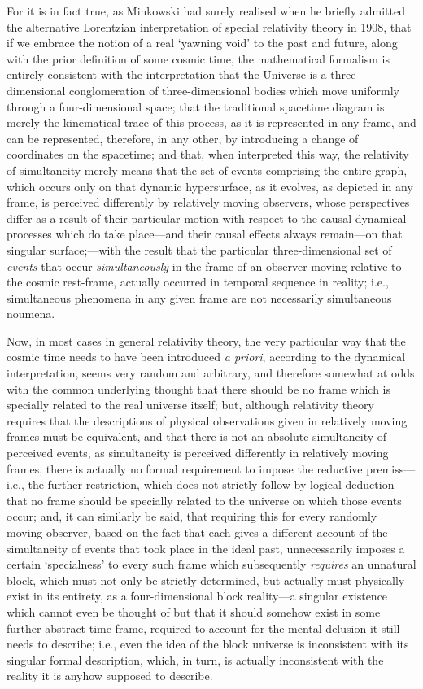 For it is in fact true, as Minkowski had surely realised when he briefly admitted the alternative Lorentzian interpretation of special relativity theory in 1908, that if we embrace the notion of a real `yawning void' to the past and future, along with the prior definition of some cosmic time, the mathematical formalism is entirely consistent with the interpretation that the Universe is a three-dimensional conglomeration of three-dimensional bodies which move uniformly through a four-dimensional space; that the traditional spacetime diagram is merely the kinematical trace of this process, as it is represented in any frame, and can be represented, therefore, in any other, by introducing a change of coordinates on the spacetime; and that, when interpreted this way, the relativity of simultaneity merely means that the set of events comprising the entire graph, which occurs only on that dynamic hypersurface, as it evolves, as depicted in any frame, is perceived differently by relatively moving observers, whose perspectives differ as a result of their particular motion with respect to the causal dynamical processes which do take place---and their causal effects always remain---on that singular surface;---with the result that the particular three-dimensional set of \textit{events} that occur \textit{simultaneously} in the frame of an observer moving relative to the cosmic rest-frame, actually occurred in temporal sequence in reality; i.e., simultaneous phenomena in any given frame are not necessarily simultaneous noumena.

Now, in most cases in general relativity theory, the very particular way that the cosmic time needs to have been introduced \textit{a priori}, according to the dynamical interpretation, seems very random and arbitrary, and therefore somewhat at odds with the common underlying thought that there should be no frame which is specially related to the real universe itself; but, although relativity theory requires that the descriptions of physical observations given in relatively moving frames must be equivalent, and that there is not an absolute simultaneity of perceived events, as simultaneity is perceived differently in relatively moving frames, there is actually no formal requirement to impose the reductive premiss---i.e., the further restriction, which does not strictly follow by logical deduction---that no frame should be specially related to the universe on which those events occur; and, it can similarly be said, that requiring this for every randomly moving observer, based on the fact that each gives a different account of the simultaneity of events that took place in the ideal past, unnecessarily imposes a certain `specialness' to every such frame which subsequently \textit{requires} an unnatural block, which must not only be strictly determined, but actually must physically exist in its entirety, as a four-dimensional block reality---a singular existence which cannot even be thought of but that it should somehow exist in some further abstract time frame, required to account for the mental delusion it still needs to describe; i.e., even the idea of the block universe is inconsistent with its singular formal description, which, in turn, is actually inconsistent with the reality it is anyhow supposed to describe. 

